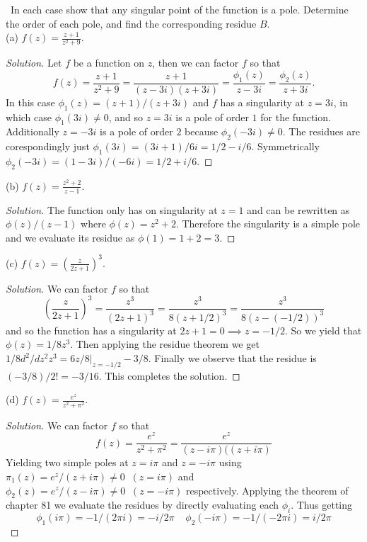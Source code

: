 \documentclass[11pt]{amsart}
\theoremstyle{definition}
\numberwithin{theorem}{section}
\numberwithin{definition}{section}
\numberwithin{equation}{section}
\newenvironment{solution}
  {\begin{proof}[Solution]}
  {\end{proof}}
\begin{document}
\medskip {}\  In each case show that any singular point of the function is a pole. Determine the order of each pole, and find the corresponding residue $B$.\\
(a) $f(z) = \frac{z+1}{z^2 + 9}.$
\begin{solution}
	Let $f$ be a function on $z$, then we can factor $f$ so that
	\begin{equation*}
		f(z) = \frac{z+1}{z^2 + 9} = \frac{z+1}{(z -3i)(z+3i)} = \frac{\phi_1(z)}{z -3i} = \frac{\phi_2(z)}{z+3i}.
	\end{equation*}
	In this case $\phi_1(z) = (z+1)/(z+3i)$ and $f$ has a singularity at $z = 3i$, in which case $\phi_1(3i) \neq 0$, and so $z = 3i$ is a pole of order $1$ for the function. Additionally $z = -3i$ is a pole of order $2$ because $\phi_2(-3i) \neq 0.$ The residues are corespondingly just $\phi_1(3i) = (3i + 1)/6i = 1/2 - i/6$. Symmetrically $\phi_2(-3i) = (1 - 3i)/(-6i) = 1/2 + i/6.$
\end{solution}
(b) $f(z) = \frac{z^2 + 2}{z - 1}.$
\begin{solution}
	The function only has on singularity at $z = 1$ and can be rewritten as $\phi(z)/(z-1)$ where $\phi(z) = z^2 +2$. Therefore the singularity is a simple pole and we evaluate its residue as $\phi(1) = 1 +2 = 3.$ 
\end{solution}
(c) $f(z) = \left(\frac{z}{2z+1}\right)^3$.
\begin{solution}
	We can factor $f$ so that
	\begin{equation*}
		\left(\frac{z}{2z+1}\right)^3 = \frac{z^3}{(2z+1)^3} = \frac{z^3}{8(z+1/2)^3} = \frac{z^3}{8(z - (-1/2))^3}
	\end{equation*}
	and so the function has a singularity at $2z +1 = 0 \implies z = -1/2.$ So we yield that $\phi(z) = 1/8z^3$. Then applying the residue theorem we get $1/8 d^2/dz^2 z^3 = 6z/8|_{z=-1/2} -3/8.$ Finally we observe that the residue is $(-3/8)/2! = -3/16.$ This completes the  solution.
\end{solution}
(d) $f(z) = \frac{e^z}{z^2 + \pi^2}.$
\begin{solution}
	We can factor $f$ so that
	\begin{equation*}
		f(z) = \frac{e^z}{z^2 + \pi^2} = \frac{e^z}{(z - i\pi)((z + i\pi)}
	\end{equation*}
	Yielding two simple poles at $z = i\pi$ and $z = -i\pi$ using $\pi_1(z) = e^z/(z+i\pi) \neq 0\;\; (z = i\pi)$ and $\phi_2(z) = e^z/(z-i\pi) \neq 0\;\; (z = -i\pi)$ respectively. Applying the theorem of chapter 81 we evaluate the residues by directly evaluating each $\phi_i$. Thus getting
	\begin{equation*}
		\phi_1(i\pi) = -1/(2\pi i) = -i/2\pi\;\;\;\;	\phi_2(-i\pi) = -1/(-2\pi i) = i/2\pi
	\end{equation*}
\end{solution}
\end{document}
